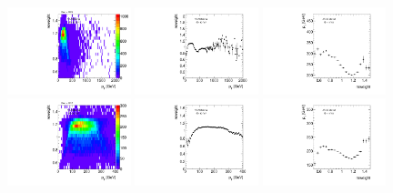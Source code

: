 \begin{figure}[htbp!]
\begin{center}
\includegraphics[angle=270, width=0.32\textwidth]{./figures/boosted/AppendixReweight/Weights/2Trk_split_Signal_leadHCand_trk0_Pt_weight.pdf}
\includegraphics[angle=270, width=0.32\textwidth]{./figures/boosted/AppendixReweight/Weights/2Trk_split_Signal_leadHCand_trk0_Pt_weight_profx.pdf}
\includegraphics[angle=270, width=0.32\textwidth]{./figures/boosted/AppendixReweight/Weights/2Trk_split_Signal_leadHCand_trk0_Pt_weight_profy.pdf}\\
\includegraphics[angle=270, width=0.32\textwidth]{./figures/boosted/AppendixReweight/Weights/2Trk_split_Signal_sublHCand_trk0_Pt_weight.pdf}
\includegraphics[angle=270, width=0.32\textwidth]{./figures/boosted/AppendixReweight/Weights/2Trk_split_Signal_sublHCand_trk0_Pt_weight_profx.pdf}
\includegraphics[angle=270, width=0.32\textwidth]{./figures/boosted/AppendixReweight/Weights/2Trk_split_Signal_sublHCand_trk0_Pt_weight_profy.pdf}\\

\end{center}
\end{figure}
